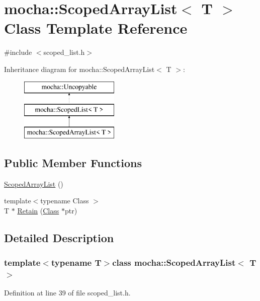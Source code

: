 \hypertarget{classmocha_1_1_scoped_array_list}{
\section{mocha::ScopedArrayList$<$ T $>$ Class Template Reference}
\label{classmocha_1_1_scoped_array_list}
}


{\ttfamily \#include $<$scoped\_\-list.h$>$}

Inheritance diagram for mocha::ScopedArrayList$<$ T $>$:\begin{figure}[H]
\begin{center}
\leavevmode
\includegraphics[height=3.000000cm]{classmocha_1_1_scoped_array_list}
\end{center}
\end{figure}
\subsection*{Public Member Functions}
\begin{DoxyCompactItemize}
\item 
\hyperlink{classmocha_1_1_scoped_array_list_a7040f00df2ec2e5e2cfdec2123ff5dcf}{ScopedArrayList} ()
\item 
{\footnotesize template$<$typename Class $>$ }\\T $\ast$ \hyperlink{classmocha_1_1_scoped_array_list_a772b167d66c30f435d102d21800c26ff}{Retain} (\hyperlink{classmocha_1_1_class}{Class} $\ast$ptr)
\end{DoxyCompactItemize}


\subsection{Detailed Description}
\subsubsection*{template$<$typename T$>$class mocha::ScopedArrayList$<$ T $>$}



Definition at line 39 of file scoped\_\-list.h.



